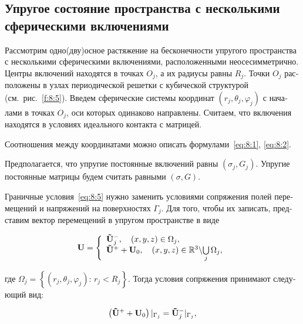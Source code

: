 \begin{russian}
\section{Упругое состояние пространства с несколькими сферическими включениями}


Рассмотрим одно(дву)осное растяжение на бесконечности упругого пространства с несколькими сферическими включениями, расположенными неосесимметрично. Центры включений находятся в точках $O_j$, а их радиусы равны $R_j$. Точки $O_j$ расположены в узлах периодической решетки с кубической структурой (см.~рис.~\ref{f:8:5}). Введем сферические системы координат $(r_j,\theta_j,\varphi_j)$ с началами в точках $O_j$, оси которых одинаково направлены. Считаем, что включения находятся в условиях идеального контакта с матрицей.

Соотношения между координатами можно описать формулами~\eqref{eq:8:1}, \eqref{eq:8:2}.

Предполагается, что упругие постоянные включений равны $(\sigma_j,G_j)$. Упругие постоянные матрицы будем считать равными $(\sigma,G)$.

Граничные условия~\eqref{eq:8:5} нужно заменить условиями сопряжения полей перемещений и напряжений на поверхностях $\Gamma_j$. Для того, чтобы их записать, представим вектор перемещений в упругом пространстве в виде

\begin{equation}
{\bf{U}} = \left\{ {\begin{array}{*{20}{l}}
{{\bf{\tilde U}}_j^ - ,\quad \left( {x,y,z} \right) \in {\Omega _j},}\\
{{{{\bf{\tilde U}}}^ + } + {{\bf{U}}_0},\quad \left( {x,y,z} \right) \in\mathbb{R}{^3}\backslash {\bigcup\limits_j\Omega _j},}
\end{array}} \right.
\label{eq:8:6}
\end{equation}

\noindent где ${\Omega _j} = \left\{ {\left( {{r_j},{\theta _j},{\varphi _j}} \right):\, {r_j} < {R_j}} \right\}$. Тогда условия сопряжения принимают следующий вид:

\begin{equation}
\left( {{{{\bf{\tilde U}}}^ + } + {{\bf{U}}_0}} \right){|_{{\Gamma _j}}} = {\bf{\tilde U}}_j^ - {|_{{\Gamma _j}}},
\label{eq:8:7}
\end{equation}


\end{russian}
